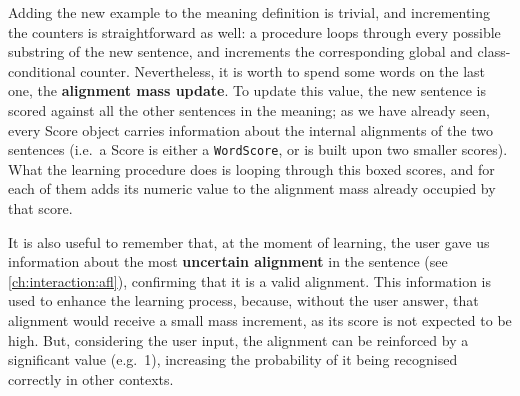Adding the new example to the meaning definition is trivial, and incrementing the counters is straightforward as well: a procedure loops through every possible substring of the new sentence, and increments the corresponding global and class-conditional counter. Nevertheless, it is worth to spend some words on the last one, the \textbf{alignment mass update}. To update this value, the new sentence is scored against all the other sentences in the meaning; as we have already seen, every Score object carries information about the internal alignments of the two sentences (i.e.\ a Score is either a \texttt{WordScore}, or is built upon two smaller scores). What the learning procedure does is looping through this boxed scores, and for each of them adds its numeric value to the alignment mass already occupied by that score.

It is also useful to remember that, at the moment of learning, the user gave us information about the most \textbf{uncertain alignment} in the sentence (see \ref{ch:interaction:afl}), confirming that it is a valid alignment. This information is used to enhance the learning process, because, without the user answer, that alignment would receive a small mass increment, as its score is not expected to be high. But, considering the user input, the alignment can be reinforced by a significant value (e.g.\ 1), increasing the probability of it being recognised correctly in other contexts.